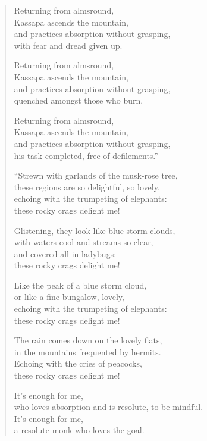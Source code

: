 \documentclass[12pt,openany]{book}%
\begin{document}
\begin{verse}
Returning from almsround, \\
Kassapa ascends the mountain, \\
and practices absorption without grasping, \\
with fear and dread given up. 

Returning from almsround, \\
Kassapa ascends the mountain, \\
and practices absorption without grasping, \\
quenched amongst those who burn. 

Returning from almsround, \\
Kassapa ascends the mountain, \\
and practices absorption without grasping, \\
his task completed, free of defilements.” 

“Strewn with garlands of the musk-rose tree, \\
these regions are so delightful, so lovely, \\
echoing with the trumpeting of elephants: \\
these rocky crags delight me! 

Glistening, they look like blue storm clouds, \\
with waters cool and streams so clear, \\
and covered all in ladybugs: \\
these rocky crags delight me! 

Like the peak of a blue storm cloud, \\
or like a fine bungalow, lovely, \\
echoing with the trumpeting of elephants: \\
these rocky crags delight me! 

The rain comes down on the lovely flats, \\
in the mountains frequented by hermits. \\
Echoing with the cries of peacocks, \\
these rocky crags delight me! 

It’s enough for me, \\
who loves absorption and is resolute, to be mindful. \\
It’s enough for me, \\
a resolute monk who loves the goal. 


\end{verse}
\end{document}
